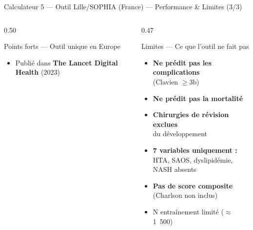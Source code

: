 \documentclass[aspectratio=169]{beamer}
\newcommand{\tightlist}{%
  \setlength{\itemsep}{1pt}\setlength{\parskip}{0pt}%
  \setlength{\parsep}{0pt}\setlength{\topsep}{2pt}}
\begin{document}
\begin{frame}{Calculateur 5 --- Outil Lille/SOPHIA (France) --- Performance \& Limites (3/3)}
\begin{columns}[T]
\begin{column}{0.50\textwidth}
\begin{exampleblock}{Points forts --- Outil unique en Europe}
\begin{itemize}
          \item Publié dans \textbf{The Lancet Digital Health} (2023)
        \end{itemize}
      \end{exampleblock}
    \end{column}
    \begin{column}{0.47\textwidth}
      \begin{alertblock}{Limites --- Ce que l'outil ne fait pas}
        \footnotesize\tightlist
        \begin{itemize}\tightlist
          \item \textbf{Ne prédit pas les complications}\\
                (Clavien $\geq$3b)
          \item \textbf{Ne prédit pas la mortalité}
          \item \textbf{Chirurgies de révision exclues}\\
                du développement
          \item \textbf{7 variables uniquement :}\\
                HTA, SAOS, dyslipidémie, NASH absents
          \item \textbf{Pas de score composite}\\
                (Charlson non inclus)
          \item N entraînement limité ($\approx$1~500)
        \end{itemize}
      \end{alertblock}
    \end{column}
  \end{columns}
\end{frame}
\end{document}
